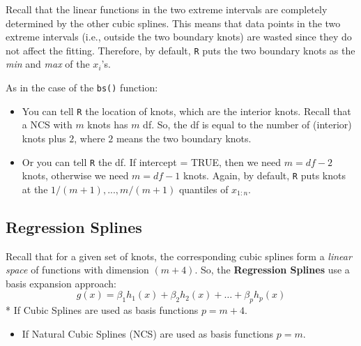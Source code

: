 \documentclass[
]{book}
\providecommand{\tightlist}{%
  \setlength{\itemsep}{0pt}\setlength{\parskip}{0pt}}
\begin{document}
Recall that the linear functions in the two extreme intervals are completely determined by the other cubic splines. This means that data points in the two extreme intervals (i.e., outside the two boundary knots) are wasted since they do not affect the fitting. Therefore, by default, \texttt{R} puts the two boundary knots as the \emph{min} and \emph{max} of the \(x_i\)'s.

As in the case of the \texttt{bs()} function:

\begin{itemize}
\item
  You can tell \texttt{R} the location of knots, which are the interior knots. Recall that a NCS with \(m\) knots has \(m\) df. So, the df is equal to the number of (interior) knots plus \(2\), where \(2\) means the two boundary knots.
\item
  Or you can tell \texttt{R} the df. If intercept = TRUE, then we need \(m= df - 2\) knots, otherwise we need \(m = df - 1\) knots. Again, by default, \texttt{R} puts knots at the \(1/(m+1),...,m/(m+1)\) quantiles of \(x_{1:n}\).
\end{itemize}

\subsection{Regression Splines}\label{regression-splines}

Recall that for a given set of knots, the corresponding cubic splines form a \emph{linear space} of functions with dimension \((m + 4)\). So, the \textbf{Regression Splines} use a basis expansion approach:
\[g(x)=\beta_1 h_1(x)+\beta_2 h_2(x)+\ldots+\beta_p h_p(x)\]
* If Cubic Splines are used as basis functions \(p=m+4\).

\begin{itemize}
\tightlist
\item
  If Natural Cubic Splines (NCS) are used as basis functions \(p=m\).
\end{itemize}
\end{document}
